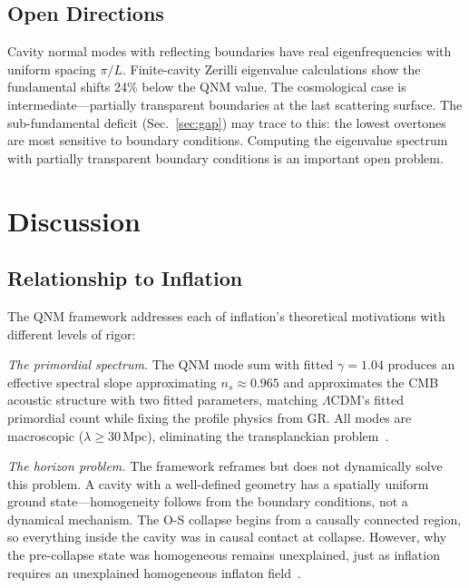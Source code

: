 \documentclass[aps,prd,twocolumn,superscriptaddress,showpacs,preprintnumbers,amsmath,amssymb,nofootinbib]{revtex4-2}
\newcommand{\lcdm}{$\Lambda$CDM}
\newcommand{\Mpc}{\,\mathrm{Mpc}}
\begin{document}
\subsection{Open Directions}

Cavity normal modes with reflecting boundaries have real eigenfrequencies with uniform spacing $\pi/L$. Finite-cavity Zerilli eigenvalue calculations show the fundamental shifts 24\% below the QNM value. The cosmological case is intermediate---partially transparent boundaries at the last scattering surface. The sub-fundamental deficit (Sec.~\ref{sec:gap}) may trace to this: the lowest overtones are most sensitive to boundary conditions. Computing the eigenvalue spectrum with partially transparent boundary conditions is an important open problem.


\section{Discussion}
\label{sec:discussion}

\subsection{Relationship to Inflation}
\label{sec:inflation}

The QNM framework addresses each of inflation's theoretical motivations with different levels of rigor:

\emph{The primordial spectrum.} The QNM mode sum with fitted $\gamma = 1.04$ produces an effective spectral slope approximating $n_s \approx 0.965$ and approximates the CMB acoustic structure with two fitted parameters, matching \lcdm's fitted primordial count while fixing the profile physics from GR. All modes are macroscopic ($\lambda \geq 30\Mpc$), eliminating the transplanckian problem~\cite{BrandenbergerMartin2001}.

\emph{The horizon problem.} The framework reframes but does not dynamically solve this problem. A cavity with a well-defined geometry has a spatially uniform ground state---homogeneity follows from the boundary conditions, not a dynamical mechanism. The O-S collapse begins from a causally connected region, so everything inside the cavity was in causal contact at collapse. However, why the pre-collapse state was homogeneous remains unexplained, just as inflation requires an unexplained homogeneous inflaton field~\cite{Ijjas2013}.
\end{document}
